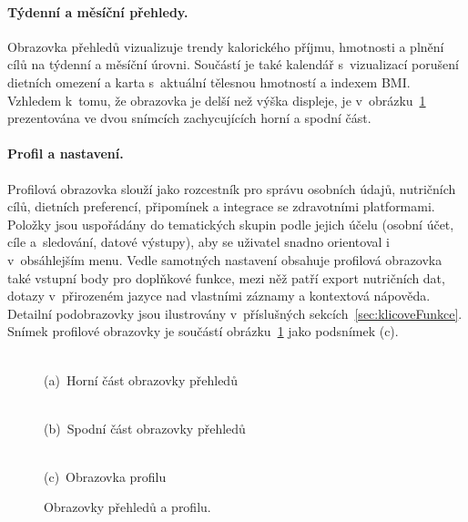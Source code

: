 \paragraph{Týdenní a měsíční přehledy.}
Obrazovka přehledů vizualizuje trendy kalorického příjmu, hmotnosti a plnění cílů na týdenní a měsíční úrovni.
Součástí je také kalendář s~vizualizací porušení dietních omezení a karta s~aktuální tělesnou hmotností a indexem BMI.
Vzhledem k~tomu, že obrazovka je delší než výška displeje, je v~obrázku~\ref{fig:screenProgress} prezentována ve dvou snímcích zachycujících horní a spodní část.

\paragraph{Profil a nastavení.}
Profilová obrazovka slouží jako rozcestník pro správu osobních údajů, nutričních cílů, dietních preferencí, připomínek a integrace se zdravotními platformami.
Položky jsou uspořádány do tematických skupin podle jejich účelu (osobní účet, cíle a~sledování, datové výstupy), aby se uživatel snadno orientoval i v~obsáhlejším menu.
Vedle samotných nastavení obsahuje profilová obrazovka také vstupní body pro doplňkové funkce, mezi něž patří export nutričních dat, dotazy v~přirozeném jazyce nad vlastními záznamy a kontextová nápověda.
Detailní podobrazovky jsou ilustrovány v~příslušných sekcích~\ref{sec:klicoveFunkce}.
Snímek profilové obrazovky je součástí obrázku~\ref{fig:screenProgress} jako podsnímek (c).

\begin{figure}[!htb]
	\centering
	\begin{minipage}[t]{0.31\textwidth}
		\centering
		\\(a)~Horní část obrazovky přehledů
	\end{minipage}\hfill
	\begin{minipage}[t]{0.31\textwidth}
		\centering
		\\(b)~Spodní část obrazovky přehledů
	\end{minipage}\hfill
	\begin{minipage}[t]{0.31\textwidth}
		\centering
		\\(c)~Obrazovka profilu
	\end{minipage}
	\caption{Obrazovky přehledů a profilu.}
	\label{fig:screenProgress}
\end{figure}

